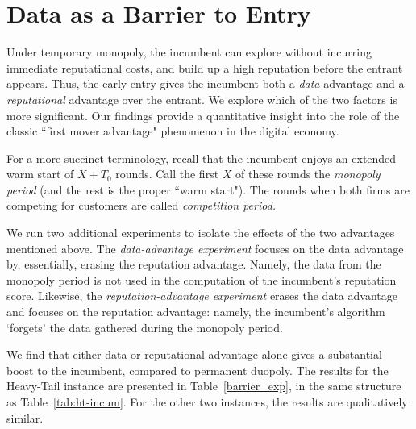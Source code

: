 \documentclass[../competing_bandits_with_appendix.tex]{subfiles}
\begin{document}
\section{Data as a Barrier to Entry}\label{sec:barriers}



Under temporary monopoly, the incumbent can explore without incurring immediate reputational costs, and build up a high reputation before the entrant appears. Thus, the early entry gives the incumbent both a \textit{data} advantage and a \textit{reputational} advantage over the entrant. We explore which of the two factors is more significant.  Our findings provide a quantitative insight into the role of the classic ``first mover advantage" phenomenon in the digital economy.


For a more succinct terminology, recall that the incumbent enjoys an extended warm start of $X+T_0$ rounds. Call the first $X$ of these rounds the \emph{monopoly period} (and the rest is the proper ``warm start"). The rounds when both firms are competing for customers are called \emph{competition period.}

We run two additional experiments to isolate the effects of the two
advantages mentioned above. The \emph{data-advantage experiment} focuses on the data advantage by, essentially, erasing the reputation advantage. Namely, the data from the monopoly period is not used in the computation of the incumbent's reputation score. Likewise, the \emph{reputation-advantage experiment} erases the data advantage and focuses on the reputation advantage: namely, the incumbent's algorithm `forgets' the data gathered during the monopoly period.

We find that either data or reputational advantage alone gives a substantial boost to the incumbent, compared to permanent duopoly. The results for the Heavy-Tail instance are presented in Table~\ref{barrier_exp}, in the same structure as Table~\ref{tab:ht-incum}. For the other two instances, the results are qualitatively similar.
\end{document}
